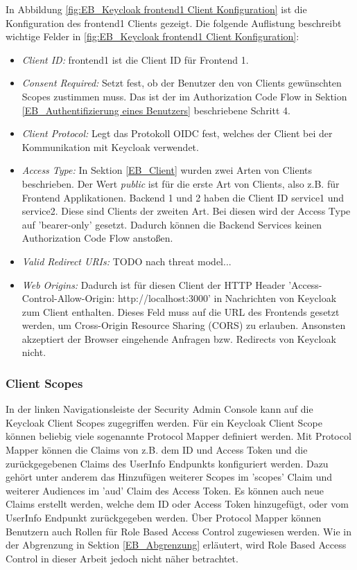 In Abbildung \ref{fig:EB_Keycloak frontend1 Client Konfiguration} ist die Konfiguration des frontend1 Clients gezeigt. Die folgende Auflistung beschreibt wichtige Felder in \ref{fig:EB_Keycloak frontend1 Client Konfiguration}:
\begin{itemize}
\item \emph{Client ID:} frontend1 ist die Client ID für Frontend 1.
\item \emph{Consent Required:} Setzt fest, ob der Benutzer den von Clients gewünschten Scopes zustimmen muss. Das ist der im Authorization Code Flow in Sektion \ref{EB_Authentifizierung eines Benutzers} beschriebene Schritt 4.
\item \emph{Client Protocol:} Legt das Protokoll OIDC fest, welches der Client bei der Kommunikation mit Keycloak verwendet.
\item \emph{Access Type:} In Sektion \ref{EB_Client} wurden zwei Arten von Clients beschrieben. Der Wert \textit{public} ist für die erste Art von Clients, also z.B. für Frontend Applikationen. Backend 1 und 2 haben die Client ID service1 und service2. Diese sind Clients der zweiten Art. Bei diesen wird der Access Type auf 'bearer-only' gesetzt. Dadurch können die Backend Services keinen Authorization Code Flow anstoßen.
\item \emph{Valid Redirect URIs:} TODO nach threat model...
\item \emph{Web Origins:} Dadurch ist für diesen Client der HTTP Header 'Access-Control-Allow-Origin: http://localhost:3000' in Nachrichten von Keycloak zum Client enthalten. Dieses Feld muss auf die URL des Frontends gesetzt werden, um Cross-Origin Resource Sharing (CORS) zu erlauben. Ansonsten akzeptiert der Browser eingehende Anfragen bzw. Redirects von Keycloak nicht.
\end{itemize}

\subsubsection{Client Scopes}

In der linken Navigationsleiste der Security Admin Console kann auf die Keycloak Client Scopes zugegriffen werden. Für ein Keycloak Client Scope können beliebig viele sogenannte Protocol Mapper definiert werden. Mit Protocol Mapper können die Claims von z.B. dem ID und Access Token und die zurückgegebenen Claims des UserInfo Endpunkts konfiguriert werden. Dazu gehört unter anderem das Hinzufügen weiterer Scopes im 'scopes' Claim und weiterer Audiences im 'aud' Claim des Access Token. Es können auch neue Claims erstellt werden, welche dem ID oder Access Token hinzugefügt, oder vom UserInfo Endpunkt zurückgegeben werden. Über Protocol Mapper können Benutzern auch Rollen für Role Based Access Control zugewiesen werden. Wie in der Abgrenzung in Sektion \ref{EB_Abgrenzung} erläutert, wird Role Based Access Control in dieser Arbeit jedoch nicht näher betrachtet. 

